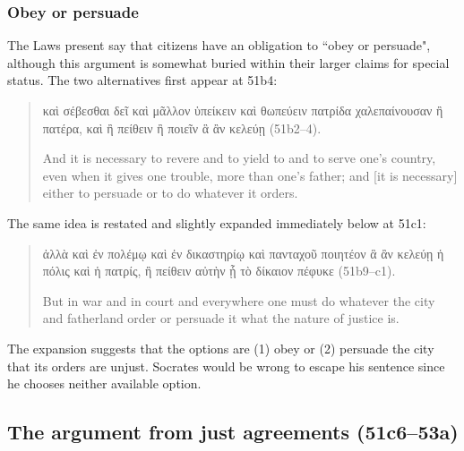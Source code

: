 \documentclass[11pt]{article}
\begin{document}

\subsubsection{Obey or persuade}

The Laws present say that citizens have an obligation to ``obey or
persuade", although this argument is somewhat buried within their larger
claims for special status.  The two alternatives first appear at 51b4:

\begin{quote}

    {\g
    καὶ σέβεσθαι δεῖ καὶ μᾶλλον ὑπείκειν καὶ θωπεύειν πατρίδα χαλεπαίνουσαν
    ἢ πατέρα, καὶ ἢ πείθειν ἢ ποιεῖν ἃ ἂν κελεύῃ
    } (51b2--4).

    And it is necessary to revere and to yield to and to serve one's
    country, even when it gives one trouble, more than one's father; and
    [it is necessary] either to persuade or to do whatever it orders.

\end{quote}

The same idea is restated and slightly expanded immediately below at 51c1:

\begin{quote}

    {\g
    ἀλλὰ καὶ ἐν πολέμῳ καὶ ἐν δικαστηρίῳ καὶ πανταχοῦ ποιητέον ἃ ἂν κελεύῃ
    ἡ πόλις καὶ ἡ πατρίς, ἢ πείθειν αὐτὴν ᾗ τὸ δίκαιον πέφυκε
    } (51b9--c1).

    But in war and in court and everywhere one must do whatever the city
    and fatherland order or persuade it what the nature of justice is.

\end{quote}

The expansion suggests that the options are (1) obey or (2) persuade the
city that its orders are unjust. Socrates would be wrong to escape his
sentence since he chooses neither available option.



\subsection{The argument from just agreements (51c6--53a)}
\end{document}

